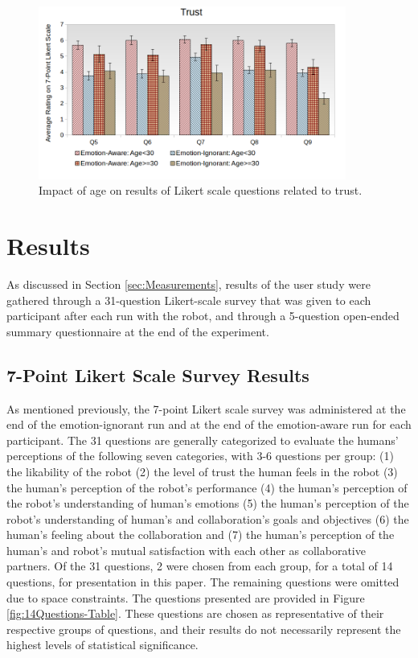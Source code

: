\documentclass[12pt]{report}
\begin{document}
\begin{figure}[tbh]
\centering
\includegraphics[width=0.9\textwidth]{figure/Age-Trust.png}
\caption{Impact of age on results of Likert scale questions related to
trust.}
\label{fig:age-trust}
\end{figure}

\section{Results}

As discussed in Section \ref{sec:Measurements}, results of the user study were
gathered through a 31-question Likert-scale survey that was given to each
participant after each run with the robot, and through a 5-question open-ended
summary questionnaire at the end of the experiment.

\subsection{7-Point Likert Scale Survey Results}
As mentioned previously, the 7-point Likert scale survey was administered at
the end of the emotion-ignorant run and at the end of the emotion-aware run for
each participant. The 31 questions are generally categorized to evaluate the
humans' perceptions of the following seven categories, with 3-6 questions per
group: (1) the likability of the robot (2) the level of trust the human feels
in the robot (3) the human's perception of the robot's performance (4) the
human's perception of the robot's understanding of human's emotions (5) the
human's perception of the robot's understanding of human's and collaboration's
goals and objectives (6) the human's feeling about the collaboration and (7)
the human's perception of the human's and robot's mutual satisfaction with each
other as collaborative partners. Of the 31 questions, 2 were chosen from each
group, for a total of 14 questions, for presentation in this paper. The
remaining questions were omitted due to space constraints. The questions
presented are provided in Figure \ref{fig:14Questions-Table}. These questions
are chosen as representative of their respective groups of questions, and their
results do not necessarily represent the highest levels of statistical
significance.
\end{document}
